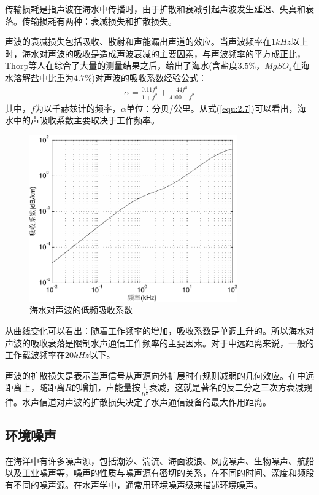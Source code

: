 传输损耗是指声波在海水中传播时，由于扩散和衰减引起声波发生延迟、失真和衰落。传输损耗有两种：衰减损失和扩散损失。

声波的衰减损失包括吸收、散射和声能漏出声道的效应。当声波频率在$1kHz$以上时，海水对声波的吸收是造成声波衰减的主要因素，与声波频率的平方成正比，Thorp等人在综合了大量的测量结果之后，给出了海水(含盐度$3.5\%$，$MgSO_4$在海水溶解盐中比重为$4.7\%$)对声波的吸收系数经验公式：
\begin{eqnarray}
    \alpha=\frac{0.11f^2}{1+f^2}+\frac{44f^2}{4100+f^2}
    \label{equ:2.7}
\end{eqnarray}
其中，$f$为以千赫兹计的频率，$\alpha$单位：分贝/公里。从式(\ref{equ:2.7})可以看出，海水中的声吸收系数主要取决于工作频率。
\begin{figure}[htb]
  \begin{center}
    \includegraphics[width=0.8\textwidth]{images/alphacoe.pdf}
  \end{center}
  \caption{海水对声波的低频吸收系数}
  \label{fig:2.1}
\end{figure}
从曲线变化可以看出：随着工作频率的增加，吸收系数是单调上升的。所以海水对声波的吸收衰落是限制水声通信工作频率的主要因素。对于中远距离来说，一般的工作载波频率在$20kHz$以下。

声波的扩散损失是表示当声信号从声源向外扩展时有规则减弱的几何效应。在中远距离上，随距离$R$的增加，声能量按$\frac{1}{R^{\frac{3}{2}}}$衰减，这就是著名的反二分之三次方衰减规律。水声信道对声波的扩散损失决定了水声通信设备的最大作用距离。
\subsection{环境噪声}
在海洋中有许多噪声源，包括潮汐、湍流、海面波浪、风成噪声、生物噪声、航船以及工业噪声等，噪声的性质与噪声源有密切的关系，在不同的时间、深度和频段有不同的噪声源。在水声学中，通常用环境噪声级来描述环境噪声。

